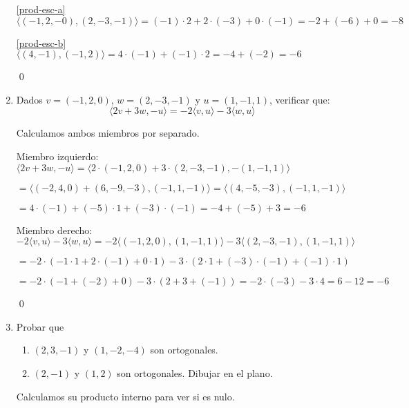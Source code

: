 \begin{enumerate}[topsep=6pt, itemsep=.4cm]
\rta


\ref{prod-esc-a} $\langle (-1, 2, -0) ,(2,-3,-1) \rangle = (-1) \cdot 2 + 2 \cdot (-3) + 0 \cdot (-1) = -2 + (-6) + 0 = \boxed{-8}$ 

\ref{prod-esc-b}  $\langle (4,-1),(-1,2) \rangle = 4 \cdot (-1) + (-1) \cdot 2 = -4 + (-2) = \boxed{-6}$

\qed

\item Dados $v = (-1, 2,0)$, $w = (2,-3,-1)$  y $u = (1,-1,1)$, verificar que:
\begin{equation*}
    \langle 2v + 3w , -u   \rangle = -2\langle v ,u \rangle -3 \langle w , u  \rangle
\end{equation*}

\rta Calculamos ambos miembros por separado.


Miembro izquierdo: $\langle 2v + 3w , -u   \rangle = \langle 2 \cdot (-1, 2,0) + 3 \cdot (2,-3,-1) , -  (1,-1,1) \rangle $

$= \langle (-2, 4,0) + (6,-9,-3) , (-1,1,-1) \rangle = \langle (4,-5,-3) , (-1,1,-1) \rangle $

$= 4 \cdot (-1) + (-5) \cdot 1 + (-3) \cdot (-1) = -4 + (-5) + 3 = \boxed{-6}$

Miembro derecho: $-2\langle v ,u \rangle -3 \langle w , u  \rangle = -2 \langle (-1, 2,0) ,(1,-1,1) \rangle -3 \langle (2,-3,-1) , (1,-1,1)  \rangle $

$= -2 \cdot ( -1 \cdot 1 + 2 \cdot (-1) + 0 \cdot 1 ) - 3 \cdot ( 2 \cdot 1 + (-3) \cdot (-1) + (-1) \cdot 1 ) $

$= -2 \cdot ( -1 + (-2) + 0) - 3 \cdot ( 2 + 3 + (-1)) = -2 \cdot (-3) - 3 \cdot  4 = 6 - 12 = \boxed{-6} $

\qed

\item Probar  que 
\begin{enumerate}
    \item\label{otrogonales-a} $(2,3,-1)$ y $(1, -2, -4)$ son ortogonales.
    \item\label{otrogonales-b} $(2,-1)$ y $(1,2)$ son ortogonales. Dibujar en el plano. 
\end{enumerate}

\rta Calculamos su producto interno para ver si es nulo.



\end{enumerate}
